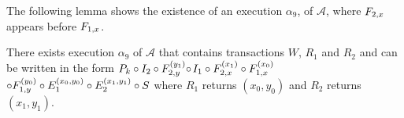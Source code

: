 
The following lemma shows the existence of an execution  $\alpha_9$, of $\mathcal{A}$, where 
$\fragt{F_{2,x}}{}{}$ appears before $\fragt{F_{1,x}}{}{}$.
\begin{lemma}   \label{lem:exec3_alpha8} 
\sloppy There exists  execution $\alpha_9$  of $\mathcal{A}$ that contains transactions $W$, $R_1$ and $R_2$
and   can be written in the form 
$\finiteprefixA{k-1}{k}  \circ  \fragt{I_2}{\alpha_8}{} \circ \fragt{F_{2,y}}{\alpha_8}{y_1} \circ 
$$\fragt{I_1}{\alpha_8}{} \circ \fragt{F_{2,x}}{\alpha_8}{x_1} 
\circ  \fragt{F_{1,x}}{\alpha_8}{x_0} 
$$ \circ \fragt{F_{1,y}}{\alpha_8}{y_0} \circ \fragt{E_1}{\alpha_8}{x_0, y_0}
\circ \fragt{E_2}{\alpha_8}{x_1, y_1}\circ \fragt{S}{\alpha_8}{}$
where $R_1$ returns $(x_0, y_0)$ and $R_2$ returns $(x_1, y_1)$.
\end{lemma}

